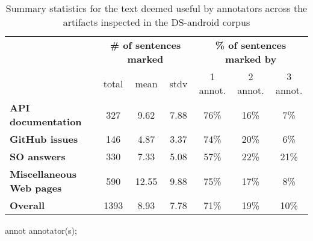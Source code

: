 \begin{table}[H]
\centering    
\caption{Summary statistics for the text deemed useful by annotators across the artifacts inspected in the \acs{DS-android} corpus}
\label{tbl:corpus-annotation-summary}
\begin{footnotesize}
\begin{threeparttable}
\begin{tabular}{lcccccc}





& \multicolumn{3}{c}{\textbf{\# of sentences marked}}
& \multicolumn{3}{c}{\textbf{\% of sentences marked by}}
\\ \cmidrule(l){2-4} \cmidrule(l){5-7} 
& total & mean & stdv 
& 1 annot. & 2 annot. & 3 annot. \\

\hline

\textbf{API documentation} 
& 327 & 9.62 & 7.88
& 76\% & 16\% & 7\%
\\
\textbf{GitHub issues} 
& 146 & 4.87 & 3.37
& 74\% & 20\% & 6\%
\\
\textbf{SO answers} 
& 330 & 7.33 & 5.08
& 57\% & 22\% & 21\%
\\
\textbf{Miscellaneous Web pages} 
& 590 & 12.55 & 9.88
& 75\% & 17\% & 8\%
\\

\hline
\textbf{Overall} 
& 1393 & 8.93 & 7.78
& 71\% & 19\% & 10\%
\\
\hline

\end{tabular}
\begin{tablenotes}
    \item[annot] annotator(s);
\end{tablenotes}
\end{threeparttable}
\end{footnotesize}
\end{table}

